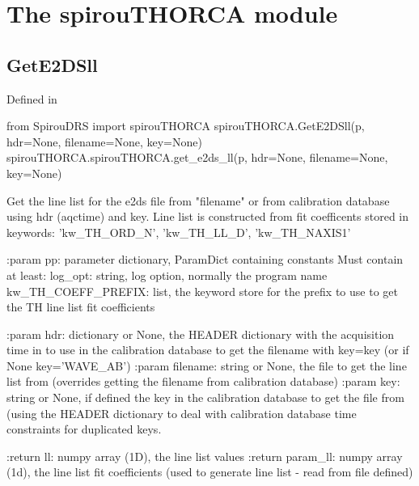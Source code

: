 
\clearpage
\newpage
\begin{minipage}{\textwidth}
\section{The spirouTHORCA module}
\label{ch:the_module:spirouTHORCA}

\subsection{GetE2DSll}

Defined in \spirouTHORCA{}

\begin{pythonbox}
from SpirouDRS import spirouTHORCA
spirouTHORCA.GetE2DSll(p, hdr=None, filename=None, key=None)
spirouTHORCA.spirouTHORCA.get_e2ds_ll(p, hdr=None, filename=None, key=None)
\end{pythonbox}

\begin{pythondocstring}
Get the line list for the e2ds file from "filename" or from calibration
database using hdr (aqctime) and key. Line list is constructed from
fit coefficents stored in keywords:
    'kw_TH_ORD_N', 'kw_TH_LL_D', 'kw_TH_NAXIS1'

:param pp: parameter dictionary, ParamDict containing constants
    Must contain at least:
            log_opt: string, log option, normally the program name
            kw_TH_COEFF_PREFIX: list, the keyword store for the prefix to
                                use to get the TH line list fit coefficients

:param hdr: dictionary or None, the HEADER dictionary with the acquisition
            time in to use in the calibration database to get the filename
            with key=key (or if None key='WAVE_AB')
:param filename: string or None, the file to get the line list from
                 (overrides getting the filename from calibration database)
:param key: string or None, if defined the key in the calibration database
            to get the file from (using the HEADER dictionary to deal with
            calibration database time constraints for duplicated keys.

:return ll: numpy array (1D), the line list values
:return param_ll: numpy array (1d), the line list fit coefficients (used to
                  generate line list - read from file defined)
\end{pythondocstring}
\end{minipage}

